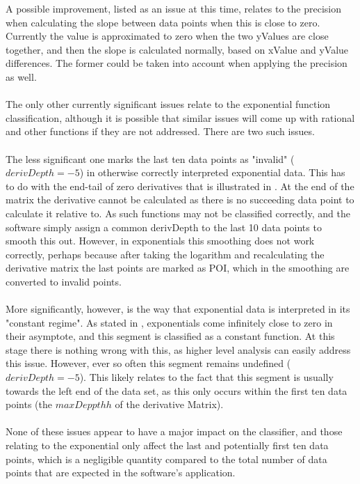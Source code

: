 \documentclass[main.tex]{subfiles}
\begin{document}
      A possible improvement, listed as an issue at this time, relates to the precision when calculating the slope between data points when this is close to zero. Currently the value is approximated to zero when the two yValues are close together, and then the slope is calculated normally, based on xValue and yValue differences. The former could be taken into account when applying the precision as well.
      \\\\
      The only other currently significant issues relate to the exponential function classification, although it is possible that similar issues will come up with rational and other functions if they are not addressed. There are two such issues.
      \\\\
      The less significant one marks the last ten data points as "invalid" ($derivDepth=-5$) in otherwise correctly interpreted exponential data. This has to do with the end-tail  of zero derivatives that is illustrated in . At the end of the matrix the derivative cannot be calculated as there is no succeeding data point to calculate it relative to. As such functions may not be classified correctly, and the software simply assign a common derivDepth to the last 10 data points to smooth this out. However, in exponentials this smoothing does not work correctly, perhaps because after taking the logarithm and recalculating the derivative matrix the last points are marked as POI, which in the smoothing are converted to invalid points.
      \\\\
      More significantly, however, is the way that exponential data is interpreted in its "constant regime". As stated in , exponentials come infinitely close to zero in their asymptote, and this segment is classified as a constant function. At this stage there is nothing wrong with this, as higher level analysis can easily address this issue. However, ever so often this segment remains undefined ($derivDepth=-5$). This likely relates to the fact that this segment is usually towards the left end of the data set, as this only occurs within the first ten data points (the $maxDeppthh$ of the derivative Matrix). 
      \\\\
      None of these issues appear to have a major impact on the classifier, and those relating to the exponential only affect the last and potentially first ten data points, which is a negligible quantity compared to the total number of data points that are expected in the software's application.
      
\end{document}
